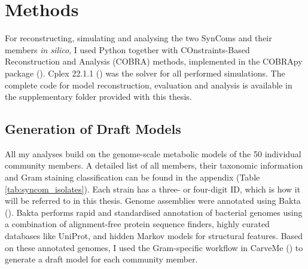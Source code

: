 \chapter{Methods}

For reconstructing, simulating and analysing the two SynComs and their members \textit{in silico}, I used Python together with COnstraints-Based Reconstruction and Analysis (COBRA) methods, implemented in the COBRApy package (\cite{ebrahim_cobrapy_2013}). Cplex 22.1.1 (\cite{noauthor_ibm_2022}) was the solver for all performed simulations. The complete code for model reconstruction, evaluation and analysis is available in the supplementary folder provided with this thesis.
\section{Generation of Draft Models}
All my analyses build on the genome-scale metabolic models of the 50 individual community members. A detailed list of all members, their taxonomic information and Gram staining classification can be found in the appendix (Table \ref{tab:syncom_isolates}). Each strain has a three- or four-digit ID, which is how it will be referred to in this thesis. Genome assemblies were annotated using Bakta (\cite{schwengers_bakta_2021}). Bakta performs rapid and standardised annotation of bacterial genomes using a combination of alignment-free protein sequence finders, highly curated databases like UniProt, and hidden Markov models for structural features. Based on these annotated genomes, I used the Gram-specific workflow in CarveMe (\cite{machado_fast_2018}) to generate a draft model for each community member. 
